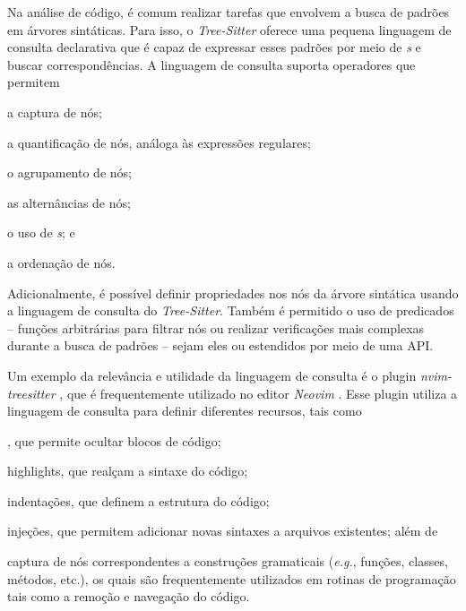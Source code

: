 \documentclass
  [11pt, a4paper, english, openright, sumario = tradicional, twoside, brazil]
  {abntex2}
\begin{document}
  Na análise de código, é comum realizar tarefas que envolvem a busca de
  padrões em árvores sintáticas. Para isso, o \textit{Tree-Sitter} oferece uma
  pequena linguagem de consulta declarativa que é capaz de expressar esses
  padrões por meio de \textit{s} e buscar correspondências. A
  linguagem de consulta suporta operadores que permitem
  \begin{inparaenum}
    \item a captura de nós;
    \item a quantificação de nós, análoga às expressões regulares;
    \item o agrupamento de nós;
    \item as alternâncias de nós;
    \item o uso de \textit{s}; e
    \item a ordenação de nós.
  \end{inparaenum}
  Adicionalmente, é possível definir propriedades nos nós da árvore sintática
  usando a linguagem de consulta do \textit{Tree-Sitter}. Também é permitido o
  uso de predicados -- funções arbitrárias para filtrar nós ou realizar
  verificações mais complexas durante a busca de padrões -- sejam eles
  \textit{} ou estendidos por meio de uma API.

  Um exemplo da relevância e utilidade da linguagem de consulta é o plugin
  \textit{nvim-treesitter} \cite{nvim-treesitter-2023-nvim}, que é
  frequentemente utilizado no editor \textit{Neovim}
  \cite{neovim-2023-hyperextensible}. Esse plugin utiliza a linguagem de
  consulta para definir diferentes recursos, tais como
  \begin{inparaenum}
    \item \textit{}, que permite ocultar blocos de código;
    \item highlights, que realçam a sintaxe do código;
    \item indentações, que definem a estrutura do código;
    \item injeções, que permitem adicionar novas sintaxes a arquivos
          existentes; além de
    \item captura de nós correspondentes a construções gramaticais
          (\textit{e.g.}, funções, classes, métodos, etc.), os quais são
          frequentemente utilizados em rotinas de programação tais como a
          remoção e navegação do código.
  \end{inparaenum}
\end{document}
